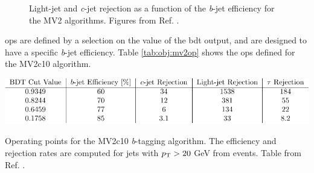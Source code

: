 \begin{figure}[h]
\begin{center}
\end{center}
 \caption{Light-jet  and \textit{c}-jet  rejection as a function of the \textit{b}-jet efficiency for the MV2 algorithms. Figures from Ref. \cite{ATL-PHYS-PUB-2016-012}.}
  \label{fig:obj:mv2}
\end{figure}

\glspl{op} are defined by a selection on the value of the \gls{bdt} output, and are designed to have a specific \textit{b}-jet efficiency.
Table \ref{tab:obj:mv2op} shows the \glspl{op} defined for the MV2c10 algorithm.

\begin{table}[h]
\begin{center}
    \includegraphics[width=1.0\textwidth]{figures/Chap5/Rizzi-Fig5-6.pdf}  
\end{center}
 \caption{Operating points for the MV2c10 \textit{b}-tagging algorithm. The efficiency and rejection rates are computed for jets with $p_{\rm T} > 20$ GeV from \ttbar events. Table from Ref. \cite{ATL-PHYS-PUB-2016-012}.}
  \label{tab:obj:mv2op}
\end{table}


